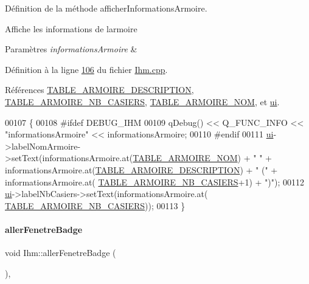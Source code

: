 Définition de la méthode afficher\+Informations\+Armoire. 

Affiche les informations de l\textquotesingle{}armoire 
\begin{DoxyParams}{Paramètres}
{\em informations\+Armoire} & \\
\hline
\end{DoxyParams}


Définition à la ligne \hyperlink{_ihm_8cpp_source_l00106}{106} du fichier \hyperlink{_ihm_8cpp_source}{Ihm.\+cpp}.



Références \hyperlink{_armoire_8h_source_l00031}{T\+A\+B\+L\+E\+\_\+\+A\+R\+M\+O\+I\+R\+E\+\_\+\+D\+E\+S\+C\+R\+I\+P\+T\+I\+ON}, \hyperlink{_armoire_8h_source_l00032}{T\+A\+B\+L\+E\+\_\+\+A\+R\+M\+O\+I\+R\+E\+\_\+\+N\+B\+\_\+\+C\+A\+S\+I\+E\+RS}, \hyperlink{_armoire_8h_source_l00030}{T\+A\+B\+L\+E\+\_\+\+A\+R\+M\+O\+I\+R\+E\+\_\+\+N\+OM}, et \hyperlink{_ihm_8h_source_l00099}{ui}.


\begin{DoxyCode}
00107 \{
00108 \textcolor{preprocessor}{    #ifdef DEBUG\_IHM}
00109         qDebug() << Q\_FUNC\_INFO << \textcolor{stringliteral}{"informationsArmoire"} << informationsArmoire;
00110 \textcolor{preprocessor}{    #endif}
00111     \hyperlink{class_ihm_a0ac5f47856566ceeeca1720109bf70ea}{ui}->labelNomArmoire->setText(informationsArmoire.at(\hyperlink{_armoire_8h_a8c8e83929e4df868beea17eda4fb5dadaed87f53039b2f5f5401a4b4c9ea8a706}{TABLE\_ARMOIRE\_NOM}) + \textcolor{stringliteral}{" "} + 
      informationsArmoire.at(\hyperlink{_armoire_8h_a8c8e83929e4df868beea17eda4fb5dadaa46613f3c7eb048c8392fb780e801cc8}{TABLE\_ARMOIRE\_DESCRIPTION}) + \textcolor{stringliteral}{" ("} + informationsArmoire.at(
      \hyperlink{_armoire_8h_a8c8e83929e4df868beea17eda4fb5dada92634af3316ad54be209ef14cc8a8981}{TABLE\_ARMOIRE\_NB\_CASIERS}+1) + \textcolor{stringliteral}{")"});
00112     \hyperlink{class_ihm_a0ac5f47856566ceeeca1720109bf70ea}{ui}->labelNbCasiers->setText(informationsArmoire.at(
      \hyperlink{_armoire_8h_a8c8e83929e4df868beea17eda4fb5dada92634af3316ad54be209ef14cc8a8981}{TABLE\_ARMOIRE\_NB\_CASIERS}));
00113 \}
\end{DoxyCode}
\mbox{\label{class_ihm_a08d82e976e48a2f8fced132a4ba22049}} 
\paragraph{\texorpdfstring{aller\+Fenetre\+Badge}{allerFenetreBadge}}
{\footnotesize\ttfamily void Ihm\+::aller\+Fenetre\+Badge (\begin{DoxyParamCaption}{ }\end{DoxyParamCaption})\hspace{0.3cm}{\ttfamily [private]}, {\ttfamily [slot]}}



